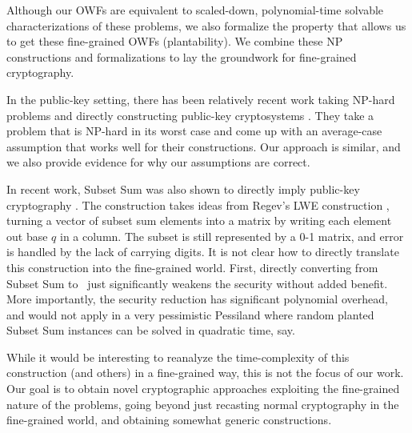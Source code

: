 Although our OWFs are equivalent to scaled-down, polynomial-time solvable characterizations of these problems, we also formalize the property that allows us to get these fine-grained OWFs (plantability). We combine these NP constructions and formalizations to lay the groundwork for fine-grained cryptography.

In the public-key setting, there has been relatively recent work taking NP-hard problems and directly constructing public-key cryptosystems \cite{ABW10}. They take a problem that is NP-hard in its worst case and come up with an average-case assumption that works well for their constructions. Our approach is similar, and we also provide evidence for why our assumptions are correct.

In recent work, Subset Sum was also shown to directly imply public-key cryptography \cite{LPS10}. The construction takes ideas from Regev's LWE construction \cite{Regev05}, turning a vector of subset sum elements into a matrix by writing each element out base $q$ in a column. The subset is still represented by a 0-1 matrix, and error is handled by the lack of carrying digits. It is not clear how to directly translate this construction into the fine-grained world. First, directly converting from Subset Sum to \kSum~just significantly weakens the security without added benefit. More importantly, the security reduction has significant polynomial overhead, and would not apply in a very pessimistic Pessiland where random planted Subset Sum instances can be solved in quadratic time, say.

While it would be interesting to reanalyze the time-complexity of this construction (and others) in a fine-grained way, this is not the focus of our work. Our goal is to obtain novel cryptographic approaches exploiting the fine-grained nature of the problems, going beyond just recasting normal cryptography in the fine-grained world, and obtaining somewhat generic constructions.


